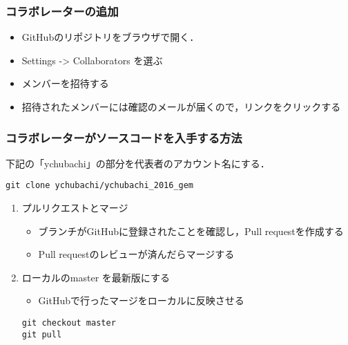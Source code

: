 \documentclass[a4paper,twoside,twocolumn]{bxjsarticle}
\begin{document}
\subsubsection{コラボレーターの追加}
\label{sec-2-2-5}

\begin{itemize}
\item GitHubのリポジトリをブラウザで開く．
\item Settings -> Collaborators を選ぶ
\item メンバーを招待する
\item 招待されたメンバーには確認のメールが届くので，リンクをクリックする
\end{itemize}

\subsubsection{コラボレーターがソースコードを入手する方法}
\label{sec-2-2-6}

下記の「ychubachi」の部分を代表者のアカウント名にする．
\begin{verbatim}
git clone ychubachi/ychubachi_2016_gem
\end{verbatim}

\begin{enumerate}
\item プルリクエストとマージ
\label{sec-2-2-6-1}

\begin{itemize}
\item ブランチがGitHubに登録されたことを確認し，Pull requestを作成する
\item Pull requestのレビューが済んだらマージする
\end{itemize}

\item ローカルのmaster を最新版にする
\label{sec-2-2-6-2}

\begin{itemize}
\item GitHubで行ったマージをローカルに反映させる
\end{itemize}

\begin{verbatim}
git checkout master
git pull
\end{verbatim}
\end{enumerate}
\end{document}
